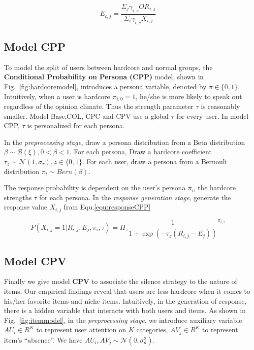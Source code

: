 \documentclass[sigconf]{acmart}
\begin{document}
\begin{equation}\label{equ:ecommunity}
 E_{c,j}=\frac{\Sigma_j\gamma_{i,c} OR_{i,j}}{\Sigma_i \gamma_{i,c} X_{i,j}}
\end{equation}

\subsection{Model CPP}
To model the split of users between hardcore and normal groups, the  \textbf{Conditional Probability on Persona (CPP)} model,  shown in Fig.~\ref{fig:hardcoremodel}, introduces a  persona variable,  denoted by $\pi \in \{0,1\}$. Intuitively, when a user is hardcore $\pi_{i,0}=1$, he/she is more likely to speak out regardless of the opinion climate. Thus the strength parameter $\tau$ is reasonably smaller.  Model Base,COL, CPC and CPV use a global $\tau$ for every user. In model CPP, $\tau$ is personalized for each persona.

In the \textit{preprocessing stage}, draw a persona distribution from a Beta distribution $\beta \sim \mathcal{B}(\xi), 0<\beta<1$. For each persona, Draw a hardcore coefficient $\tau_z \sim \mathcal{N}(1,\sigma_\tau), z\in \{0,1\}$. For each user, draw a persona from a Bernouli distribution $\pi_i \sim Bern (\beta)$. 

The response probability is dependent on the user's persona $\pi_i$, the hardcore strengths $\tau$ for each persona. In the \textit{response generation stage}, generate the response value $X_{i,j}$ from Equ.\ref{equ:responseCPP}

\begin{equation}\label{equ:responseCPP}
 P(X_{i,j}=1|R_{i,j},E_j,\pi_i,\tau)=\Pi_z {\frac{1}{1+\exp{(-\tau_z(R_{i,j}-E_j))}}}^{\pi_{i,z}}
\end{equation}

\subsection{Model CPV}
Finally we give model \textbf{CPV} to associate the silence strategy to the nature of items. Our empirical findings reveal that users are less hardcore when it comes to his/her favorite items and niche items. Intuitively, in the generation of response, there is a hidden variable that interacts with both users and items. As shown in Fig.~\ref{fig:itemmodel}, in the \textit{preprocessing stage}, we introduce auxiliary variable $AU_i\in R^K$ to represent user attention on $K$ categories, $AV_j\in R^K$ to represent item's ``absence''. We have  $AU_i, AV_j \sim \mathcal{N}(0,\sigma_a^2)$.
\end{document}
